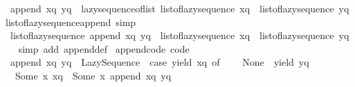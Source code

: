 \begin{isabellebody}
\ \ {\isachardoublequoteopen}append\ xq\ yq\ {\isacharequal}{\kern0pt}\ lazy{\isacharunderscore}{\kern0pt}sequence{\isacharunderscore}{\kern0pt}of{\isacharunderscore}{\kern0pt}list\ {\isacharparenleft}{\kern0pt}list{\isacharunderscore}{\kern0pt}of{\isacharunderscore}{\kern0pt}lazy{\isacharunderscore}{\kern0pt}sequence\ xq\ {\isacharat}{\kern0pt}\ list{\isacharunderscore}{\kern0pt}of{\isacharunderscore}{\kern0pt}lazy{\isacharunderscore}{\kern0pt}sequence\ yq{\isacharparenright}{\kern0pt}{\isachardoublequoteclose}\isanewline
\isanewline
{}\isamarkupfalse%
\ list{\isacharunderscore}{\kern0pt}of{\isacharunderscore}{\kern0pt}lazy{\isacharunderscore}{\kern0pt}sequence{\isacharunderscore}{\kern0pt}append\ {\isacharbrackleft}{\kern0pt}simp{\isacharbrackright}{\kern0pt}{\isacharcolon}{\kern0pt}\isanewline
\ \ {\isachardoublequoteopen}list{\isacharunderscore}{\kern0pt}of{\isacharunderscore}{\kern0pt}lazy{\isacharunderscore}{\kern0pt}sequence\ {\isacharparenleft}{\kern0pt}append\ xq\ yq{\isacharparenright}{\kern0pt}\ {\isacharequal}{\kern0pt}\ list{\isacharunderscore}{\kern0pt}of{\isacharunderscore}{\kern0pt}lazy{\isacharunderscore}{\kern0pt}sequence\ xq\ {\isacharat}{\kern0pt}\ list{\isacharunderscore}{\kern0pt}of{\isacharunderscore}{\kern0pt}lazy{\isacharunderscore}{\kern0pt}sequence\ yq{\isachardoublequoteclose}\isanewline
%
\isadelimproof
\ \ %
\endisadelimproof
%
\isatagproof
{}\isamarkupfalse%
\ {\isacharparenleft}{\kern0pt}simp\ add{\isacharcolon}{\kern0pt}\ append{\isacharunderscore}{\kern0pt}def{\isacharparenright}{\kern0pt}%
\endisatagproof
{\isafoldproof}%
%
\isadelimproof
\isanewline
%
\endisadelimproof
\isanewline
{}\isamarkupfalse%
\ append{\isacharunderscore}{\kern0pt}code\ {\isacharbrackleft}{\kern0pt}code{\isacharbrackright}{\kern0pt}{\isacharcolon}{\kern0pt}\isanewline
\ \ {\isachardoublequoteopen}append\ xq\ yq\ {\isacharequal}{\kern0pt}\ Lazy{\isacharunderscore}{\kern0pt}Sequence\ {\isacharparenleft}{\kern0pt}{\isasymlambda}{\isacharunderscore}{\kern0pt}{\isachardot}{\kern0pt}\ case\ yield\ xq\ of\isanewline
\ \ \ \ None\ {\isasymRightarrow}\ yield\ yq\isanewline
\ \ {\isacharbar}{\kern0pt}\ Some\ {\isacharparenleft}{\kern0pt}x{\isacharcomma}{\kern0pt}\ xq{\isacharprime}{\kern0pt}{\isacharparenright}{\kern0pt}\ {\isasymRightarrow}\ Some\ {\isacharparenleft}{\kern0pt}x{\isacharcomma}{\kern0pt}\ append\ xq{\isacharprime}{\kern0pt}\ yq{\isacharparenright}{\kern0pt}{\isacharparenright}{\kern0pt}{\isachardoublequoteclose}\isanewline
%
\isadelimproof
\ \ %
\endisadelimproof
%
\isatagproof
{}\isamarkupfalse%

\end{isabellebody}
